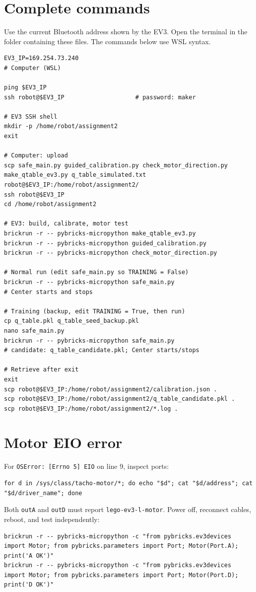 \documentclass[11pt]{article}
\begin{document}
\section{Complete commands}
Use the current Bluetooth address shown by the EV3. Open the terminal in the folder containing these files. The commands below use WSL syntax.
\begin{lstlisting}
EV3_IP=169.254.73.240
# Computer (WSL)

ping $EV3_IP
ssh robot@$EV3_IP                    # password: maker

# EV3 SSH shell
mkdir -p /home/robot/assignment2
exit

# Computer: upload
scp safe_main.py guided_calibration.py check_motor_direction.py make_qtable_ev3.py q_table_simulated.txt robot@$EV3_IP:/home/robot/assignment2/
ssh robot@$EV3_IP
cd /home/robot/assignment2

# EV3: build, calibrate, motor test
brickrun -r -- pybricks-micropython make_qtable_ev3.py
brickrun -r -- pybricks-micropython guided_calibration.py
brickrun -r -- pybricks-micropython check_motor_direction.py

# Normal run (edit safe_main.py so TRAINING = False)
brickrun -r -- pybricks-micropython safe_main.py
# Center starts and stops

# Training (backup, edit TRAINING = True, then run)
cp q_table.pkl q_table_seed_backup.pkl
nano safe_main.py
brickrun -r -- pybricks-micropython safe_main.py
# candidate: q_table_candidate.pkl; Center starts/stops

# Retrieve after exit
exit
scp robot@$EV3_IP:/home/robot/assignment2/calibration.json .
scp robot@$EV3_IP:/home/robot/assignment2/q_table_candidate.pkl .
scp robot@$EV3_IP:/home/robot/assignment2/*.log .
\end{lstlisting}
\section{Motor EIO error}
For \texttt{OSError: [Errno 5] EIO} on line 9, inspect ports:
\begin{lstlisting}
for d in /sys/class/tacho-motor/*; do echo "$d"; cat "$d/address"; cat "$d/driver_name"; done
\end{lstlisting}
Both \texttt{outA} and \texttt{outD} must report \texttt{lego-ev3-l-motor}. Power off, reconnect cables, reboot, and test independently:
\begin{lstlisting}
brickrun -r -- pybricks-micropython -c "from pybricks.ev3devices import Motor; from pybricks.parameters import Port; Motor(Port.A); print('A OK')"
brickrun -r -- pybricks-micropython -c "from pybricks.ev3devices import Motor; from pybricks.parameters import Port; Motor(Port.D); print('D OK')"
\end{lstlisting}
\end{document}
